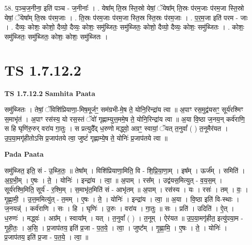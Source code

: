 \documentclass[17pt]{extarticle}
\begin{document}
58. प॒ञ्च॒ज॒नीना॒ इति॑ पञ्च - ज॒नीनाः᳚ । . येषा᳚म् ति॒स्र स्ति॒स्रो येषां॒ ॅयेषा᳚म् ति॒स्रः प॑रम॒जाः प॑रम॒जा स्ति॒स्रो येषां॒ ॅयेषा᳚म् ति॒स्रः प॑रम॒जाः । . ति॒स्रः प॑रम॒जाः प॑रम॒जा स्ति॒स्र स्ति॒स्रः प॑रम॒जाः । . प॒र॒म॒जा इति॑ परम - जाः । . दैव्यः॒ कोशः॒ कोशो॒ दैव्यो॒ दैव्यः॒ कोशः॒ समु॑ब्जितः॒ समु॑ब्जितः॒ कोशो॒ दैव्यो॒ दैव्यः॒ कोशः॒ समु॑ब्जितः । . कोशः॒ समु॑ब्जितः॒ समु॑ब्जितः॒ कोशः॒ कोशः॒ समु॑ब्जितः । \newline
\pagebreak
{}

\section{ TS 1.7.12.2 }

\textbf{TS 1.7.12.2 } \newline
\textbf{Samhita Paata} \newline

समु॑ब्जितः । तेषां॒ ॅविशि॑प्रियाणा॒-मिष॒मूर्जꣳ॒॒ सम॑ग्रभी-मे॒ष ते॒ योनि॒रिन्द्रा॑य त्वा ॥ अ॒पाꣳ रस॒मुद्व॑यसꣳ॒॒ सूर्य॑रश्मिꣳ स॒माभृ॑तं । अ॒पाꣳ रस॑स्य॒ यो रस॒स्तं ॅवो॑ गृह्णाम्युत्त॒ममे॒ष ते॒ योनि॒रिन्द्रा॑य त्वा ॥ अ॒या वि॒ष्ठा ज॒नय॒न् कर्व॑राणि॒ स हि घृणि॑रु॒रुर् वरा॑य गा॒तुः । स प्रत्युदै᳚द् ध॒रुणो मद्ध्वो॒ अग्रꣳ॒॒ स्वायां॒ ॅयत् त॒नुवां᳚ ( ) त॒नूमैर॑यत । उ॒प॒या॒मगृ॑हीतोऽसि प्र॒जाप॑तये त्वा॒ जुष्टं॑ गृह्णाम्ये॒ष ते॒ योनिः॑ प्र॒जाप॑तये त्वा ॥ \newline

\textbf{Pada Paata} \newline

समु॑ब्जित॒ इति॒ सं - उ॒ब्जि॒तः॒ ॥ तेषा᳚म् । विशि॑प्रियाणा॒मिति॒ वि - शि॒प्रि॒या॒णा॒म् । इष᳚म् । ऊर्ज᳚म् । समिति॑ । अ॒ग्र॒भी॒म् । ए॒षः । ते॒ । योनिः॑ । इन्द्रा॑य । त्वा॒ ॥ अ॒पाम् । रस᳚म् । उद्व॑यस॒मित्युत् - व॒य॒स॒म् । सूर्य॑रश्मि॒मिति॒ सूर्य॑ - र॒श्मि॒म् । स॒माभृ॑त॒मिति॑ सं - आभृ॑तम् ॥ अ॒पाम् । रस॑स्य । यः । रसः॑ । तम् । वः॒ । गृ॒ह्णा॒मी॒ । उ॒त्त॒ममित्यु॑त् - त॒मम् । ए॒षः । ते॒ । योनिः॑ । इन्द्रा॑य । त्वा॒ ॥ अ॒या । वि॒ष्ठा इति॑ वि-स्थाः । ज॒नयन्न्॑ । कर्व॑राणि । सः । हि । घृणिः॑ । उ॒रुः । वरा॑य । गा॒तुः ॥ सः । प्रति॑ । उदिति॑ । ऐ॒त् । ध॒रुणः॑ । मद्ध्वः॑ । अग्र᳚म् । स्वाया᳚म् । यत् । त॒नुवां᳚ ( ) । त॒नूम् । ऐर॑यत ॥ उ॒प॒या॒मगृ॑हीत॒ इत्यु॑पया॒म - गृ॒ही॒तः॒ । अ॒सि॒ । प्र॒जाप॑तय॒ इति॑ प्र॒जा - प॒त॒ये॒ । त्वा॒ । जुष्ट᳚म् । गृ॒ह्णा॒मि॒ । ए॒षः । ते॒ । योनिः॑ । प्र॒जाप॑तय॒ इति॑ प्र॒जा - प॒त॒ये॒ । त्वा॒ ॥  \newline
\end{document}
